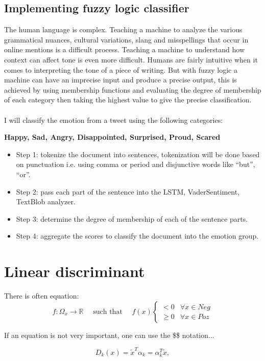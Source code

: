 \subsection{Implementing fuzzy logic classifier}

The human language is complex. Teaching a machine to analyze the various grammatical nuances, cultural variations, slang and misspellings that occur in online mentions is a difficult process. Teaching a machine to understand how context can affect tone is even more difficult. Humans are fairly intuitive when it comes to interpreting the tone of a piece of writing. But with fuzzy logic a machine can have an imprecise input and produce a precise output, this is achieved by using membership functions and evaluating the degree of membership of each category then taking the highest value to give the precise classification.\\ \\

I will classify the emotion from a tweet using the following categories:



\textbf{Happy, Sad, Angry, Disappointed, Surprised, Proud, Scared}
\begin{itemize}
\item
Step 1: tokenize the document into sentences, tokenization will be done based on punctuation i.e. using comma or period and disjunctive words like “but”, “or”.
\item
Step 2: pass each part of the sentence into the LSTM, VaderSentiment, TextBlob analyzer.
\item
Step 3: determine the degree of membership of each of the sentence parts.
\item
Step 4: aggregate the scores to classify the document into the emotion group.

\end{itemize}







\section{Linear discriminant}\label{sec:THEORY:linear}

There is often equation:
\begin{equation}
	f: \Omega_x \rightarrow {\mathbb{R}}
	\quad\text{ such that }
	\quad f(x)
	\begin{cases}
		<0 & \forall x\in Neg \\
		\geq 0 & \forall x\in Poz
	\end{cases}
	\label{eq:diszkr:fugg}
\end{equation}



If an equation is not very important, one can use the \$\$ notation...

$$D_k(x)=\tilde{x}^T\alpha_k=\alpha_k^T\tilde{x},$$

